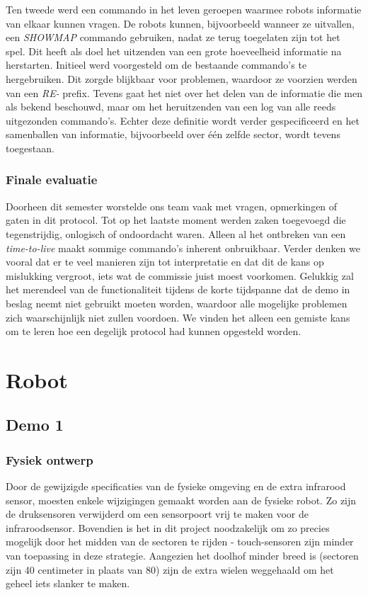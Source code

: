 \documentclass[12pt,a4paper]{report}
\begin{document}
Ten tweede werd een commando in het leven geroepen waarmee robots informatie van elkaar kunnen vragen. De robots kunnen, bijvoorbeeld wanneer ze uitvallen, een \emph{SHOWMAP} commando gebruiken, nadat ze terug toegelaten zijn tot het spel. Dit heeft als doel het uitzenden van een grote hoeveelheid informatie na herstarten. Initieel werd voorgesteld om de bestaande commando's te hergebruiken. Dit zorgde blijkbaar voor problemen, waardoor ze voorzien werden van een \emph{RE-} prefix. Tevens gaat het niet over het delen van de informatie die men als bekend beschouwd, maar om het heruitzenden van een log van alle reeds uitgezonden commando's. Echter deze definitie wordt verder gespecificeerd en het samenballen van informatie, bijvoorbeeld over \'e\'en zelfde sector, wordt tevens toegestaan.

\subsection{Finale evaluatie}

Doorheen dit semester worstelde ons team vaak met vragen, opmerkingen of gaten in dit protocol. Tot op het laatste moment werden zaken toegevoegd die tegenstrijdig, onlogisch of ondoordacht waren.
Alleen al het ontbreken van een \emph{time-to-live} maakt sommige commando's inherent onbruikbaar. Verder denken we vooral dat er te veel manieren zijn tot interpretatie en dat dit de kans op mislukking vergroot, iets wat de commissie juist moest voorkomen. Gelukkig zal het merendeel van de functionaliteit tijdens de korte tijdspanne dat de demo in beslag neemt niet gebruikt moeten worden, waardoor alle mogelijke problemen zich waarschijnlijk niet zullen voordoen. We vinden het alleen een gemiste kans om te leren hoe een degelijk protocol had kunnen opgesteld worden.

\chapter{Robot}

\section{Demo 1}

\subsection{Fysiek ontwerp}

Door de gewijzigde specificaties van de fysieke omgeving en de extra infrarood sensor, moesten enkele wijzigingen gemaakt worden aan de fysieke robot. Zo zijn de druksensoren verwijderd om een sensorpoort vrij te maken voor de infraroodsensor. Bovendien is het in dit project noodzakelijk om zo precies mogelijk door het midden van de sectoren te rijden - touch-sensoren zijn minder van toepassing in deze strategie. Aangezien het doolhof minder breed is (sectoren zijn 40 centimeter in plaats van 80) zijn de extra wielen weggehaald om het geheel iets slanker te maken.
\end{document}
